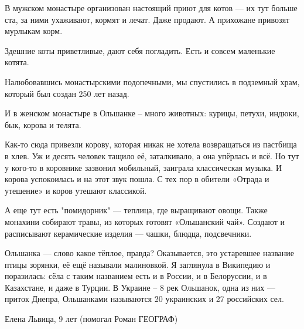 В мужском монастыре организован настоящий приют для котов --- их тут больше ста,
за ними ухаживают, кормят и лечат. Даже продают. А прихожане привозят мурлыкам
корм. 

Здешние коты приветливые, дают себя погладить. Есть и совсем маленькие котята.

Налюбовавшись монастырскими подопечными, мы спустились в подземный храм, который был создан 250 лет назад. 

И в женском монастыре в Ольшанке -- много животных: курицы, петухи, индюки, бык, корова и телята. 

Как-то сюда привезли корову, которая никак не хотела возвращаться из пастбища в
хлев. Уж и десять человек тащило её, заталкивало, а она упёрлась и всё. Но тут
у кого-то в коровнике зазвонил мобильный, заиграла классическая музыка. И
корова успокоилась и на этот звук пошла. С тех пор в обители «Отрада и
утешение» и коров утешают классикой.

А еще тут есть "помидорник" --- теплица, где выращивают овощи. Также монахини
собирают травы, из которых готовят «Ольшанский чай». Создают и расписывают
керамические изделия --- чашки, блюдца, подсвечники.

Ольшанка --- слово какое тёплое, правда? Оказывается, это устаревшее название
птицы зорянки, её ещё называли малиновкой.  Я заглянула в Википедию и
поразилась: сёла с таким названием есть и в России, и в Белоруссии, и в
Казахстане, и даже в Турции. В Украине -- 8 рек Ольшанок, одна из них --- приток
Днепра, Ольшанками называются 20 украинских и 27 российских сел.

Елена Львица, 9 лет (помогал Роман ГЕОГРАФ)
